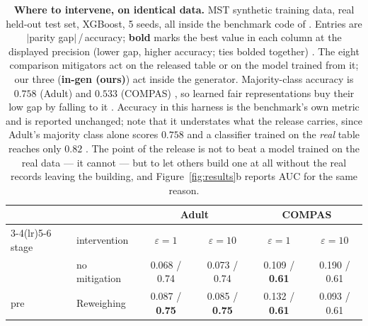 \begin{table}[t]
\centering\footnotesize
\caption{\textbf{Where to intervene, on identical data.} MST synthetic
training data, real held-out test set, XGBoost, 5 seeds, all inside the
benchmark code of \citet{angelozzi2026where}. Entries are $|$parity
gap$|$\,/\,accuracy; \textbf{bold} marks the best value in each column at
the displayed precision (lower gap, higher accuracy; ties bolded together) .
The eight comparison mitigators act on the released table or on the model
trained from it; our three (\textbf{in-gen (ours)}) act inside the
generator. Majority-class accuracy is $0.758$ (Adult) and $0.533$ (COMPAS) ,
so learned fair representations buy their low gap by falling to it . Accuracy
in this harness is the benchmark's own metric and is reported unchanged; note
that it understates what the release carries, since Adult's majority class
alone scores $0.758$  and a classifier trained on the \emph{real} table reaches
only $0.82$ . The point of the release is not to beat a model trained on the
real data --- it cannot --- but to let others build one at all without the
real records leaving the building, and Figure~\ref{fig:results}b reports AUC
for the same reason.  }
\label{tab:baselines}
\begin{tabular}{llcccc}
\toprule
 & & \multicolumn{2}{c}{Adult} & \multicolumn{2}{c}{COMPAS} \\
\cmidrule(lr){3-4}\cmidrule(lr){5-6}
stage & intervention & $\varepsilon{=}1$ & $\varepsilon{=}10$ & $\varepsilon{=}1$ & $\varepsilon{=}10$ \\
\midrule
 & no mitigation        & 0.068 / 0.74 & 0.073 / 0.74 & 0.109 / \textbf{0.61} & 0.190 / 0.61 \\
\addlinespace[2pt]
pre  & Reweighing         & 0.087 / \textbf{0.75} & 0.085 / \textbf{0.75} & 0.132 / \textbf{0.61} & 0.093 / 0.61 \\

\end{tabular}
\end{table}
